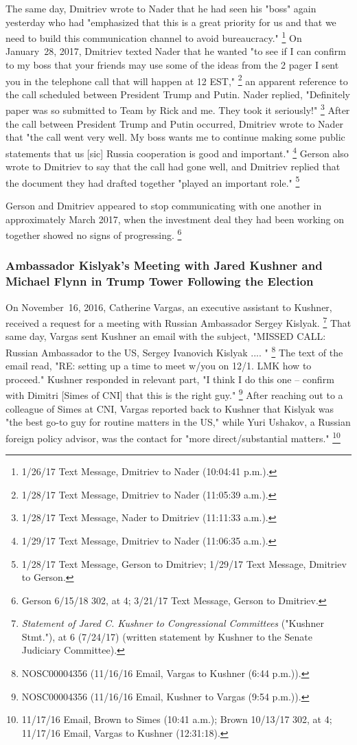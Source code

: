 The same day, Dmitriev wrote to Nader that he had seen his "boss" again yesterday who had "emphasized that this is a great priority for us and that we need to build this communication channel to avoid bureaucracy."%
\footnote{1/26/17 Text Message, Dmitriev to Nader (10:04:41 p.m.).}
On January~28, 2017, Dmitriev texted Nader that he wanted "to see if I can confirm to my boss that your friends may use some of the ideas from the 2 pager I sent you in the telephone call that will happen at 12 EST,"%
\footnote{1/28/17 Text Message, Dmitriev to Nader (11:05:39 a.m.).}
an apparent reference to the call scheduled between President Trump and Putin.
Nader replied, "Definitely paper was so submitted to Team by Rick and me.
They took it seriously!"%
\footnote{1/28/17 Text Message, Nader to Dmitriev (11:11:33 a.m.).}
After the call between President Trump and Putin occurred, Dmitriev wrote to Nader that "the call went very well.
My boss wants me to continue making some public statements that us [sic] Russia cooperation is good and important."%
\footnote{1/29/17 Text Message, Dmitriev to Nader (11:06:35 a.m.).}
Gerson also wrote to Dmitriev to say that the call had gone well, and Dmitriev replied that the document they had drafted together "played an important role."%
\footnote{1/28/17 Text Message, Gerson to Dmitriev;
1/29/17 Text Message, Dmitriev to Gerson.}

Gerson and Dmitriev appeared to stop communicating with one another in approximately March 2017, when the investment deal they had been working on together showed no signs of progressing.%
\footnote{Gerson 6/15/18 302, at 4;
3/21/17 Text Message, Gerson to Dmitriev.}

\subsubsection{Ambassador Kislyak's Meeting with Jared Kushner and Michael Flynn in Trump Tower Following the Election}

On November~16, 2016, Catherine Vargas, an executive assistant to Kushner, received a request for a meeting with Russian Ambassador Sergey Kislyak.%
\footnote{\textit{Statement of Jared C. Kushner to Congressional Committees} ("Kushner Stmt."), at 6 (7/24/17) (written statement by Kushner to the Senate Judiciary Committee).}
That same day, Vargas sent Kushner an email with the subject, "MISSED CALL: Russian Ambassador to the US, Sergey Ivanovich Kislyak .... "%
\footnote{NOSC00004356 (11/16/16 Email, Vargas to Kushner (6:44 p.m.)).}
The text of the email read, "RE: setting up a time to meet w/you on 12/1. LMK how to proceed."
Kushner responded in relevant part, "I think I do this one -- confirm with Dimitri [Simes of CNI] that this is the right guy."%
\footnote{NOSC00004356 (11/16/16 Email, Kushner to Vargas (9:54 p.m.)).}
After reaching out to a colleague of Simes at CNI, Vargas reported back to Kushner that Kislyak was "the best go-to guy for routine matters in the US," while Yuri Ushakov, a Russian foreign policy advisor, was the contact for "more direct/substantial matters."%
\footnote{11/17/16 Email, Brown to Simes (10:41 a.m.);
Brown 10/13/17 302, at 4;
11/17/16 Email, Vargas to Kushner (12:31:18).}

